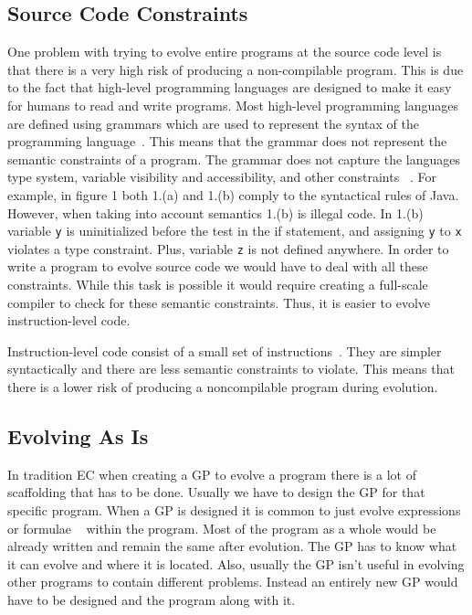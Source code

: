 \documentclass{sig-alternate}
\begin{document}
\subsection{Source Code Constraints}
One problem with trying to evolve entire programs at the source code level is that there is a very high risk of producing a non-compilable program. This is due to the fact that high-level programming languages are designed to make it easy for humans to read and write programs. Most high-level programming languages are defined using grammars which are used to represent the syntax of the programming language~\cite{Oracle:2013,Assembly:2010}. This means that the grammar does not represent the semantic constraints of a program. The grammar does not capture the languages type system, variable visibility and accessibility, and other constraints ~\cite{FINCH:2011}. For example, in figure 1 both 1.(a) and 1.(b) comply to the syntactical rules of Java. However, when taking into account semantics 1.(b) is illegal code. In 1.(b) variable \texttt{y} is uninitialized before the test in the if statement, and assigning \texttt{y} to \texttt{x} violates a type constraint. Plus, variable \texttt{z} is not defined anywhere.  In order to write a program to evolve source code we would have to deal with all these constraints. While this task is possible it would require creating a full-scale compiler to check for these semantic constraints. Thus, it is easier to evolve instruction-level code. \par

Instruction-level code consist of a small set of instructions~\cite{Assembly:2010}. They are simpler syntactically and there are less semantic constraints to violate. This means that there is a lower risk of producing a noncompilable program during evolution. 

\subsection{Evolving As Is}
In tradition EC when creating a GP to evolve a program there is a lot of scaffolding that has to be done. Usually we have to design the GP for that specific program. When a GP is designed it is common to just evolve expressions or formulae ~\cite{FINCH:2011} within the program. Most of the program as a whole would be already written and remain the same after evolution. The GP has to know what it can evolve and where it is located. Also, usually the GP isn't useful in evolving other programs to contain different problems. Instead an entirely new GP would have to be designed and the program along with it.
\end{document}
